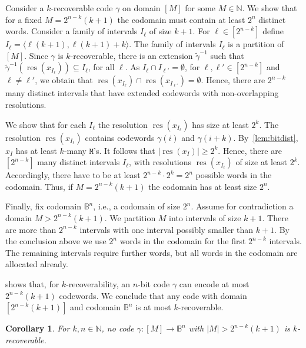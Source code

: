 \documentclass[9pt,journal,compsoc]{IEEEtran}
\newtheorem{corollary}[theorem]{Corollary}
\theoremstyle{remark}
\DeclareMathOperator{\res}{res}
\newcommand{\mfu}{\mathtt{M}}
\newcommand{\IN}{\mathbb{N}}
\newcommand{\IB}{\mathbb{B}}
\newcommand{\ang}[1]{\langle{#1}\rangle}
\newcommand{\intvl}[1]{\ang{#1}}
\begin{document}
\begin{IEEEproof}
  Consider a $k$-recoverable code $\gamma$ on domain $[M]$ for some $M\in \IN$.
  We show that for a fixed $M = 2^{n-k}(k+1)$ the codomain must contain at least $2^n$ distinct words.
  Consider a family of intervals $I_\ell$ of size $k+1$.
  For $\ell\in[2^{n-k}]$ define $I_\ell=\intvl{\ell(k+1),\ell(k+1)+k}$.
  The family of intervals $I_\ell$ is a partition of $[M]$.
  Since $\gamma$ is $k$-recoverable, there is an extension $\widetilde{\gamma}^{-1}$
  such that $\widetilde{\gamma}^{-1}(\res(x_{I_\ell}))\subseteq I_\ell$, for all $\ell$.
  As $I_\ell \cap I_{\ell'} =\emptyset$, for $\ell,\ell'\in[2^{n-k}]$ and $\ell \neq\ell'$,
  we obtain that $\res(x_{I_\ell})\cap\res(x_{I_{\ell'}})=\emptyset$.
  Hence, there are $2^{n-k}$ many distinct intervals that have extended
  codewords with non-overlapping resolutions.

  We show that for each $I_\ell$ the resolution $\res(x_{I_\ell})$ has size at least $2^k$.
  The resolution $\res(x_{I_\ell})$ contains codewords $\gamma(i)$ and $\gamma(i+k)$.
  By~\cref{lem:bitdist}, $x_I$ has at least $k$-many $\mfu$'s. It follows that $|\res(x_I)|\geq 2^k$.
  Hence, there are $[2^{n-k}]$ many distinct intervals $I_\ell$, with resolutions $\res(x_{I_\ell})$ of size at least $2^k$.
  Accordingly, there have to be at least $2^{n-k}\cdot 2^k=2^n$ possible words in the codomain.
  Thus, if $M = 2^{n-k}(k+1)$ the codomain has at least size $2^n$.

  Finally, fix codomain $\IB^n$, i.e., a codomain of size $2^n$.
  Assume for contradiction a domain $M > 2^{n-k}(k+1)$.
  We partition $M$ into intervals of size $k+1$. There are more than $2^{n-k}$ intervals
  with one interval possibly smaller than $k+1$. By the conclusion above we use
  $2^n$ words in the codomain for the first $2^{n-k}$ intervals.
  The remaining intervals require further words, but all words in the codomain
  are allocated already.
\end{IEEEproof}

 shows that, for $k$-recoverability, an $n$-bit code $\gamma$
can encode at most $2^{n-k}(k+1)$ codewords.
We conclude that any code with domain $[2^{n-k}(k+1)]$ and codomain $\IB^n$
  is at most $k$-recoverable.

\begin{corollary}\label{col:recoverability}\label{thm:recoverability}
  For $k,n\in\IN$, no code $\gamma\colon[M]\rightarrow\IB^n$ with $|M|>2^{n-k}(k+1)$ is
  $k$-recoverable.
\end{corollary}
\end{document}
